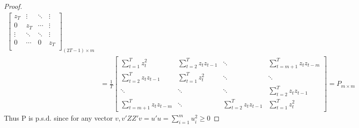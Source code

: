 \documentclass[DIV=14,titlepage=false]{scrreprt}
\begin{document}
\begin{proof}
\begin{align*}
{\begin{bmatrix}
            z_T & \vdots & \ddots & \vdots \\
            0 & z_T & \cdots & \vdots \\
            \vdots & \ddots & \ddots & \vdots \\
            0 & \cdots & 0 & z_T \\
        \end{bmatrix}}_{(2T-1)\times m}\\
        &= \frac{1}{T}\begin{bmatrix}
             \sum_{t=1}^{T}z_t^2 &  \sum_{t=2}^{T}z_tz_{t-1} & \ddots & \sum_{t=m+1}^{T}z_tz_{t-m}\\
             \sum_{t=2}^{T}z_tz_{t-1} &  \sum_{t=1}^{T}z_t^2 & \ddots & \ddots\\
            \ddots & \ddots & \ddots &  \sum_{t=2}^{T}z_tz_{t-1}\\
            \sum_{t=m+1}^{T}z_tz_{t-m} & \ddots &  \sum_{t=2}^{T}z_tz_{t-1} &   \sum_{t=1}^{T}z_t^2
        \end{bmatrix}
        =P_{m\times m}
    \end{align*}
Thus P is p.s.d. since for any vector $v, v'ZZ'v=u'u=\sum_{i=1}^{m}u_i^2\geq 0$
\end{proof}
\end{document}
